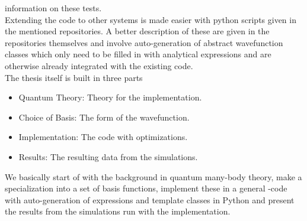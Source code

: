     information on these tests. \\
    Extending the code to other systems is made easier with python scripts
    given in the mentioned repositories. A better description of these are
    given in the repositories themselves and involve auto-generation of
    abstract wavefunction classes which only need to be filled in with
    analytical expressions and are otherwise already integrated with the
    existing code. \\
    The thesis itself is built in three parts
        \begin{itemize}
            \item Quantum Theory: Theory for the implementation.
            \item Choice of Basis: The form of the wavefunction.
            \item Implementation: The code with optimizations.
            \item Results: The resulting data from the simulations.
        \end{itemize}
    We basically start of with the background in quantum many-body theory, make
    a specialization into a set of basis functions, implement these in a
    general \CC-code with auto-generation of expressions and template classes
    in Python and present the results from the simulations run with the
    implementation.

